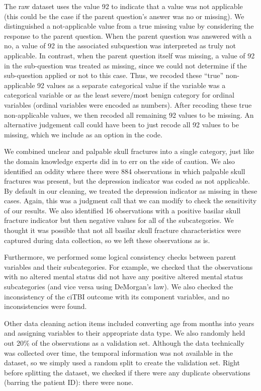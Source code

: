 \documentclass[10pt,letterpaper]{article}
\begin{document}
The raw dataset uses the value 92 to indicate that a value was not applicable (this could be the case if the parent question's answer was no or missing).
We distinguished a not-applicable value from a true missing value by considering the response to the parent question.
When the parent question was answered with a no, a value of 92 in the associated subquestion was interpreted as truly not applicable.
In contrast, when the parent question itself was missing, a value of 92 in the sub-question was treated as missing, since we could not determine if the sub-question applied or not
to this case.
Thus, we recoded these ``true'' non-applicable 92 values as a separate categorical value if the variable was a categorical variable or as the least severe\slash most benign category
for ordinal variables (ordinal variables were encoded as numbers).
After recoding these true non-applicable values, we then recoded all remaining 92 values to be missing.
An alternative judgement call could have been to just recode all 92 values to be missing, which we include as an option in the code.

We combined unclear and palpable skull fractures into a single category, just like the domain knowledge experts did in \cite{Kuppermann2009} to err on the side of caution.
We also identified an oddity where there were 884 observations in which palpable skull fractures was present, but the depression indicator was coded as not applicable.
By default in our cleaning, we treated the depression indicator as missing in these cases. Again, this was a judgment call that we can modify to check the sensitivity of our results.
We also identified 16 observations with a positive basilar skull fracture indicator but then negative values for all of the subcategories.
We thought it was possible that not all basilar skull fracture characteristics were captured during data collection, so we left these observations as is.

Furthermore, we performed some logical consistency checks between parent variables and their subcategories. For example, we checked that the observations with no altered mental status did not have any positive
altered mental status subcategories (and vice versa using DeMorgan's law). We also checked the inconsistency of the ciTBI outcome with its component variables, and no inconsistencies were found.

Other data cleaning action items included converting age from months into years and assigning variables to their appropriate data type.
We also randomly held out 20\% of the observations as a validation set. Although the data technically was collected over time,
the temporal information was not available in the dataset, so we simply used a random split to create the validation set.
Right before splitting the dataset, we checked if there were any duplicate observations (barring the patient ID): there were none.
\end{document}
